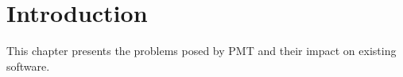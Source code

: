 \section{Introduction}
\label{sec:introduction}
This chapter presents the problems posed by \gls{PMT} and their impact on existing software.



\medskip




